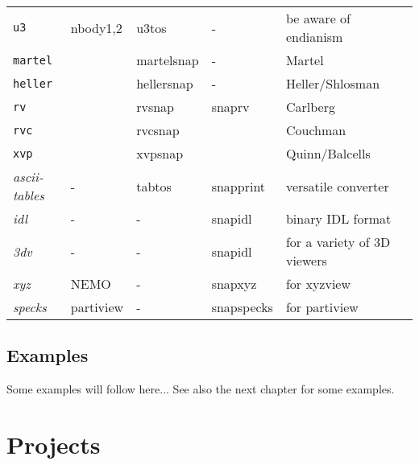 \begin{itemize}
\begin{itemize}
\begin{center}
\begin{table}[h!]
\begin{tabular}{||l|l|l|l|l|l||}
{\tt u3}        & nbody1,2  &    u3tos       &    -          & be aware of endianism \\

{\tt martel}    &           &  martelsnap    &    -          &  Martel \\
{\tt heller}    &           &  hellersnap    &    -          &  Heller/Shlosman \\
{\tt rv}       &           &  rvsnap       &   snaprv      & Carlberg \\
{\tt rvc}       &           &  rvcsnap       &         &  Couchman \\
{\tt xvp}      &           &  xvpsnap       &         &  Quinn/Balcells \\

{\it ascii-tables}   &   -   &  tabtos    &    snapprint     &   versatile converter\\

{\it idl}         &    -     &     -      &    snapidl        &   binary IDL format  \\
{\it 3dv}         &    -     &     -      &    snapidl        &   for a variety of 3D viewers \\
{\it xyz}         &   NEMO    &     -      &    snapxyz        &  for xyzview \\
{\it specks}      &  partiview &     -      &    snapspecks      &  for partiview \\







\hline 




\end{tabular}
\end{table}
\end{center}

\section{Examples}

Some examples will follow here... See also the next chapter for some examples.



\chapter                {Projects}


\end{itemize}
\end{itemize}
